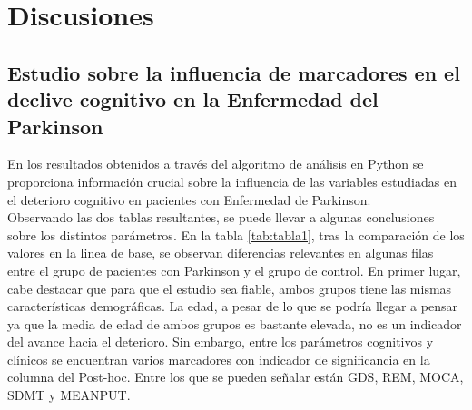 \chapter{Discusiones} \label{discusiones}

\section{Estudio sobre la influencia de marcadores en el declive cognitivo en la Enfermedad del Parkinson}
En los resultados obtenidos a través del algoritmo de análisis en Python se proporciona información crucial sobre la influencia de las variables estudiadas en el deterioro cognitivo en pacientes con Enfermedad de Parkinson.\\

Observando las dos tablas resultantes, se puede llevar a algunas conclusiones sobre los distintos parámetros. En la tabla \ref{tab:tabla1}, tras la comparación de los valores en la linea de base, se observan diferencias relevantes en algunas filas entre el grupo de pacientes con Parkinson y el grupo de control. En primer lugar, cabe destacar que para que el estudio sea fiable, ambos grupos tiene las mismas características demográficas. La edad, a pesar de lo que se podría llegar a pensar ya que la media de edad de ambos grupos es bastante elevada, no es un indicador del avance hacia el deterioro. Sin embargo, entre los parámetros cognitivos y clínicos se encuentran varios marcadores con indicador de significancia en la columna del Post-hoc. Entre los que se pueden señalar están GDS, REM, MOCA, SDMT y MEANPUT. \\

